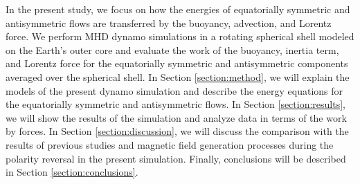 In the present study, we focus on how the energies of equatorially symmetric and antisymmetric flows are transferred by the buoyancy, advection, and Lorentz force. 
We perform MHD dynamo simulations in a rotating spherical shell modeled on the Earth's outer core and evaluate the work of the buoyancy, inertia term, and Lorentz force for the equatorially symmetric and antisymmetric components averaged over the spherical shell. 
In Section \ref{section:method}, we will explain the models of the present dynamo simulation and describe the energy equations for the equatorially symmetric and antisymmetric flows. 
In Section \ref{section:results}, we will show the results of the simulation and analyze data in terms of the work by forces. 
In Section \ref{section:discussion}, we will discuss the comparison with the results of previous studies and magnetic field generation processes during the polarity reversal in the present simulation. 
Finally, conclusions will be described in Section \ref{section:conclusions}.
